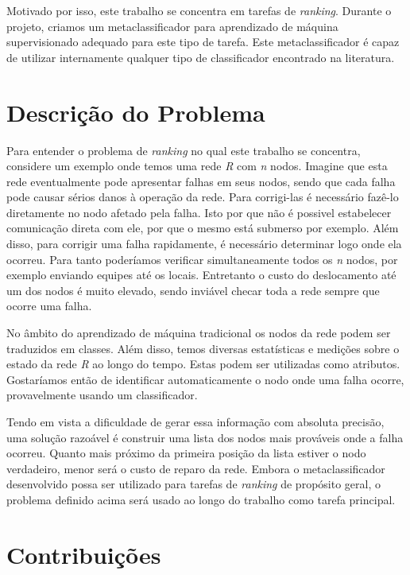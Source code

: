 Motivado por isso, este trabalho se concentra em tarefas de \textit{ranking}.
Durante o projeto, criamos um metaclassificador para aprendizado de máquina supervisionado adequado para este tipo de tarefa.
Este metaclassificador é capaz de utilizar internamente qualquer tipo de classificador encontrado na literatura.

\section{Descrição do Problema}

Para entender o problema de \textit{ranking} no qual este trabalho se concentra, considere um exemplo onde temos uma rede \textit{R} com \textit{n} nodos.
Imagine que esta rede eventualmente pode apresentar falhas em seus nodos, sendo que cada falha pode causar sérios danos à operação da rede.
Para corrigi-las é necessário fazê-lo diretamente no nodo afetado pela falha.
Isto por que não é possivel estabelecer comunicação direta com ele, por que o mesmo está submerso por exemplo.
Além disso, para corrigir uma falha rapidamente, é necessário determinar logo onde ela ocorreu.
Para tanto poderíamos verificar simultaneamente todos os \textit{n} nodos, por exemplo enviando equipes até os locais.
Entretanto o custo do deslocamento até um dos nodos é muito elevado, sendo inviável checar toda a rede sempre que ocorre uma falha.

No âmbito do aprendizado de máquina tradicional os nodos da rede podem ser traduzidos em classes.
Além disso, temos diversas estatísticas e medições sobre o estado da rede \textit{R} ao longo do tempo.
Estas podem ser utilizadas como atributos.
Gostaríamos então de identificar automaticamente o nodo onde uma falha ocorre, provavelmente usando um classificador.

Tendo em vista a dificuldade de gerar essa informação com absoluta precisão, uma solução razoável é construir uma lista dos nodos mais prováveis onde a falha ocorreu.
Quanto mais próximo da primeira posição da lista estiver o nodo verdadeiro, menor será o custo de reparo da rede.
Embora o metaclassificador desenvolvido possa ser utilizado para tarefas de \textit{ranking} de propósito geral, o problema definido acima será usado ao longo do trabalho como tarefa principal.

\newpage
\section{Contribuições}

